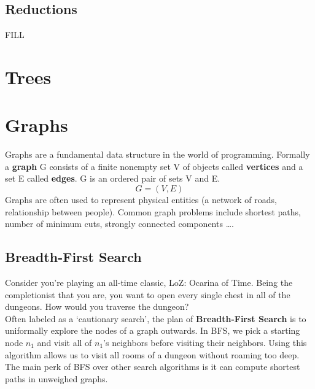 \documentclass[]{book}
\begin{document}
  \section{Reductions}
  FILL
  \chapter{Trees}

  \chapter{Graphs}
  Graphs are a fundamental data structure in the world of programming. Formally
  a \textbf{graph} G consists of a finite nonempty set V of objects called \textbf{vertices}
  and a set E called \textbf{edges}. G is an ordered pair of sets V and E. $$ G = (V,E)$$
  \indent Graphs are often used to represent physical entities (a network of roads, relationship
  between people). Common graph problems include shortest paths, number of minimum cuts,
  strongly connected components \ldots.

  \section{Breadth-First Search}
  Consider you're playing an all-time classic, LoZ: Ocarina of Time. Being the
  completionist that you are, you want to open every single chest in all of the dungeons. How would
  you traverse the dungeon?\\
  \indent Often labeled as a `cautionary search', the plan of \textbf{Breadth-First Search}
  is to uniformally explore the nodes of a graph outwards. In BFS, we pick a starting node
  $n_1$ and visit all of $n_1$'s neighbors before visiting their neighbors. Using this algorithm
  allows us to visit all rooms of a dungeon without roaming too deep. \\
  \indent The main perk of BFS over other search algorithms is it can compute shortest
  paths in unweighed graphs.
\end{document}
